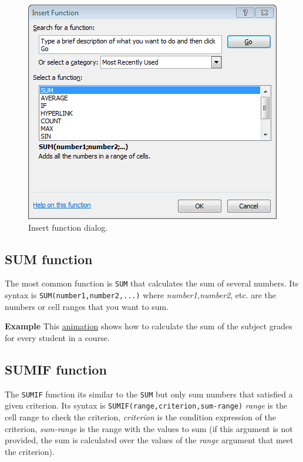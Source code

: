 \begin{figure}[htbp]
\begin{center}
\includegraphics[scale=0.7]{../img/dialog_insert_function.png}
\end{center}
\caption{Insert function dialog.}
\label{img-dialog_insert_function}
\end{figure}

\subsection{SUM function}\hypertarget{sum-function}{}\label{sum-function}

The most common function is \texttt{SUM} that calculates the sum of several numbers. Its syntax is \texttt{SUM(number1,number2,...)} where \emph{number1,number2}, etc. are the numbers or cell ranges that you want to sum.

\textbf{Example} This \href{http://aprendeconalf.es/office/excel/manual/img/example_function_sum.gif}{animation} shows how to calculate the sum of the subject grades for every student in a course.

\subsection{SUMIF function}\hypertarget{sumif-function}{}\label{sumif-function}

The \texttt{SUMIF} function its similar to the \texttt{SUM} but only sum numbers that satisfied a given criterion. Its syntax is \texttt{SUMIF(range,criterion,sum-range)} \emph{range} is the cell range to check the criterion, \emph{criterion} is the condition expression of the criterion, \emph{sum-range} is the range with the values to sum (if this argument is not provided, the sum is calculated over the values of the \emph{range} argument that meet the criterion).

